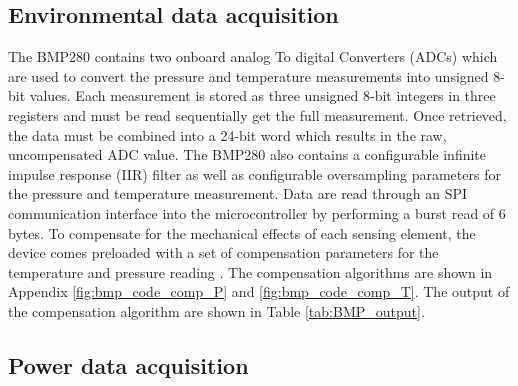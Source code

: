 \subsection{Environmental data acquisition}
The BMP280  contains two onboard analog To digital Converters (ADCs) which are used to convert the pressure and temperature measurements into unsigned 8-bit values. Each measurement is stored as three unsigned 8-bit integers in three registers and must be read sequentially get the full measurement. Once retrieved, the data must be combined into a 24-bit word which results in the raw, uncompensated ADC value. The BMP280 also contains a configurable infinite impulse response (IIR) filter as well as configurable oversampling parameters for the pressure and temperature measurement. Data are read through an SPI communication interface into the microcontroller by performing a burst read of 6 bytes. To compensate for the mechanical effects of each sensing element, the device comes preloaded with a set of compensation parameters for the temperature and pressure reading \cite{BMP280_Datasheet}. The compensation algorithms are shown in Appendix \ref{fig:bmp_code_comp_P} and \ref{fig:bmp_code_comp_T}. The output of the compensation algorithm are shown in Table \ref{tab:BMP_output}.

\begin{table}[H]
	\centering
	\caption{Description of output values from BMP280 post processing.}
	\setlength{\extrarowheight}{5pt}
	
	\label{tab:BMP_output}
\end{table}

\subsection{Power data acquisition}

